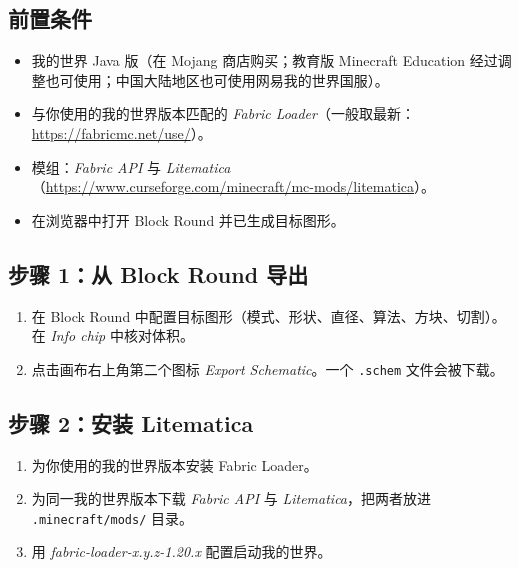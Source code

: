 \documentclass[12pt,a4paper]{scrartcl}
\begin{document}
\subsection{前置条件}
\begin{itemize}[leftmargin=1.3em,itemsep=0.1em,topsep=0.2em,nosep]
  \item 我的世界 Java 版（在 Mojang 商店购买；教育版 Minecraft Education 经过调整也可使用；中国大陆地区也可使用网易我的世界国服）。
  \item 与你使用的我的世界版本匹配的 \emph{Fabric Loader}（一般取最新：\url{https://fabricmc.net/use/}）。
  \item 模组：\emph{Fabric API} 与 \emph{Litematica}（\url{https://www.curseforge.com/minecraft/mc-mods/litematica}）。
  \item 在浏览器中打开 Block Round 并已生成目标图形。
\end{itemize}

\subsection{步骤 1：从 Block Round 导出}
\begin{enumerate}[leftmargin=1.5em,itemsep=0.15em,topsep=0.3em]
  \item 在 Block Round 中配置目标图形（模式、形状、直径、算法、方块、切割）。在 \emph{Info chip} 中核对体积。
  \item 点击画布右上角第二个图标 \emph{Export Schematic}。一个 \texttt{.schem} 文件会被下载。
\end{enumerate}

\subsection{步骤 2：安装 Litematica}
\begin{enumerate}[leftmargin=1.5em,itemsep=0.15em,topsep=0.3em]
  \item 为你使用的我的世界版本安装 Fabric Loader。
  \item 为同一我的世界版本下载 \emph{Fabric API} 与 \emph{Litematica}，把两者放进 \texttt{.minecraft/mods/} 目录。
  \item 用 \emph{fabric-loader-x.y.z-1.20.x} 配置启动我的世界。
\end{enumerate}
\end{document}

